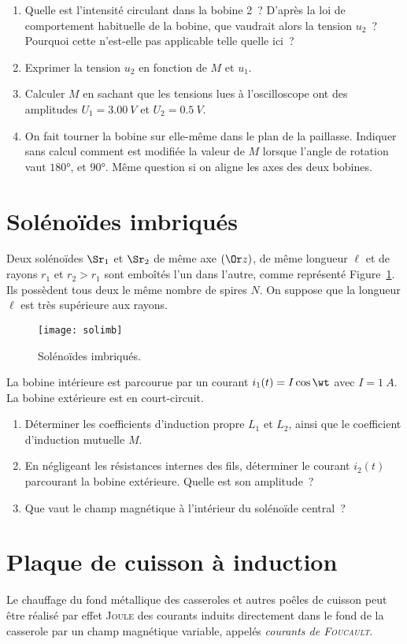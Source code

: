 \documentclass[a4paper, 10pt, final, garamond]{book}
\begin{document}
\begin{enumerate}
	\item Quelle est l'intensité circulant dans la bobine 2~? D'après la loi de
	      comportement habituelle de la bobine, que vaudrait alors la tension $u_2$~?
	      Pourquoi cette n'est-elle pas applicable telle quelle ici~?
	\item Exprimer la tension $u_2$ en fonction de $M$ et $u_1$.
	\item Calculer $M$ en sachant que les tensions lues à l'oscilloscope ont des
	      amplitudes $U_1 = \SI{3.00}{V}$ et $U_2 = \SI{0.5}{V}$.
	\item On fait tourner la bobine sur elle-même dans le plan de la paillasse.
	      Indiquer sans calcul comment est modifiée la valeur de $M$ lorsque l'angle
	      de rotation vaut $\ang{180}$, et $\ang{90}$. Même question si on aligne les
	      axes des deux bobines.
\end{enumerate}

\section{Solénoïdes imbriqués}
\label{sec:solimb}
Deux solénoïdes $\Sr_1$ et $\Sr_2$ de même axe $(\Or z)$, de même longueur $\ell
$ et de rayons $r_1$ et $r_2 > r_1$ sont emboîtés l'un dans l'autre, comme
représenté Figure~\ref{fig:solimb}. Ils possèdent tous deux le même nombre de
spires $N$. On suppose que la longueur $\ell $ est très supérieure aux rayons.
\begin{figure}[h]
	\centering
	\texttt{[image: solimb]}
	\caption{Solénoïdes imbriqués.}
	\label{fig:solimb}
\end{figure}
La bobine intérieure est parcourue par un courant $i_1(t) = I \cos{\wt}$ avec $I
	= \SI{1}{A}$. La bobine extérieure est en court-circuit.
\begin{enumerate}
	\item Déterminer les coefficients d'induction propre $L_1$ et $L_2$, ainsi que
	      le coefficient d'induction mutuelle $M$.
	\item En négligeant les résistances internes des fils, déterminer le courant
	      $i_2(t)$ parcourant la bobine extérieure. Quelle est son amplitude~?
	\item Que vaut le champ magnétique à l'intérieur du solénoïde central~?
\end{enumerate}

\section{Plaque de cuisson à induction}
\label{sec:plqind}
Le chauffage du fond métallique des casseroles et autres poêles de cuisson peut
être réalisé par effet \textsc{Joule} des courants induits directement dans le
fond de la casserole par un champ magnétique variable, appelés \textit{courants
	de \textsc{Foucault}}.
\end{document}
